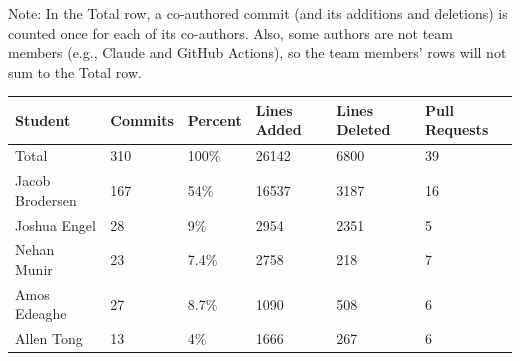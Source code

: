 \documentclass{article}
\begin{document}



Note: In the Total row, a co-authored commit (and its additions and deletions)
is counted once for each of its co-authors. Also, some authors are not team members
(e.g., Claude and GitHub Actions), so the team members' rows will not sum to the
Total row.

\begin{table}[H]
\centering
\begin{tabular}{llllll}
\toprule
\textbf{Student} & \textbf{Commits} & \textbf{Percent} & \textbf{Lines Added} &
\textbf{Lines Deleted} & \textbf{Pull Requests}\\
\midrule
Total & 310 & 100\% & 26142 & 6800 & 39\\
Jacob Brodersen & 167 & 54\% & 16537 & 3187 & 16\\
Joshua Engel & 28 & 9\% & 2954 & 2351 & 5\\
Nehan Munir & 23 & 7.4\% & 2758 & 218 & 7\\
Amos Edeaghe & 27 & 8.7\% & 1090& 508 & 6\\
Allen Tong & 13 & 4\% & 1666 & 267 & 6\\
\bottomrule
\end{tabular}
\end{table}

\end{document}
